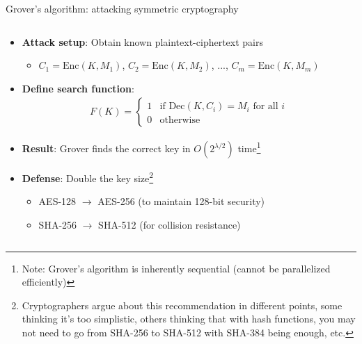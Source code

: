 \documentclass[aspectratio=169, lualatex, handout]{beamer}
\begin{document}
\begin{frame}{Grover's algorithm: attacking symmetric cryptography}
	\begin{columns}[c]
		\begin{column}{1\textwidth}
			\begin{itemize}
				\item \textbf{Attack setup}: Obtain known plaintext-ciphertext pairs
				      \begin{itemize}
					      \item $C_1 = \text{Enc}(K, M_1)$, $C_2 = \text{Enc}(K, M_2)$, ..., $C_m = \text{Enc}(K, M_m)$
				      \end{itemize}
				\item \textbf{Define search function}:
				      \begin{align*}
					      F(K) = \begin{cases}
						             1 & \text{if } \text{Dec}(K, C_i) = M_i \text{ for all } i \\
						             0 & \text{otherwise}
					             \end{cases}
				      \end{align*}
				\item \textbf{Result}: Grover finds the correct key in $O(2^{\lambda/2})$ time\footnote{Note: Grover's algorithm is inherently sequential (cannot be parallelized efficiently)}
				\item \textbf{Defense}: Double the key size\footnote{Cryptographers argue about this recommendation in different points, some thinking it's too simplistic, others thinking that with hash functions, you may not need to go from SHA-256 to SHA-512 with SHA-384 being enough, etc.}
				      \begin{itemize}
					      \item AES-128 $\rightarrow$ AES-256 (to maintain 128-bit security)
					      \item SHA-256 $\rightarrow$ SHA-512 (for collision resistance)
				      \end{itemize}
			\end{itemize}
		\end{column}
	\end{columns}
\end{frame}
\end{document}
